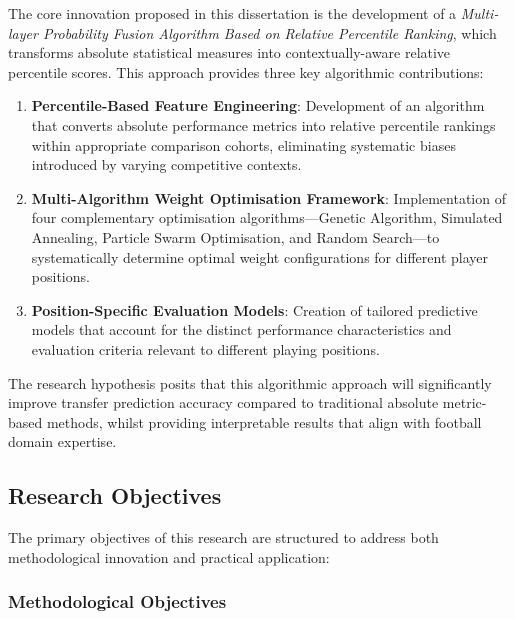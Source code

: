 The core innovation proposed in this dissertation is the development of a \textit{Multi-layer Probability Fusion Algorithm Based on Relative Percentile Ranking}, which transforms absolute statistical measures into contextually-aware relative percentile scores. This approach provides three key algorithmic contributions:

\begin{enumerate}
    \item \textbf{Percentile-Based Feature Engineering}: Development of an algorithm that converts absolute performance metrics into relative percentile rankings within appropriate comparison cohorts, eliminating systematic biases introduced by varying competitive contexts.
    
    \item \textbf{Multi-Algorithm Weight Optimisation Framework}: Implementation of four complementary optimisation algorithms—Genetic Algorithm, Simulated Annealing, Particle Swarm Optimisation, and Random Search—to systematically determine optimal weight configurations for different player positions.
    
    \item \textbf{Position-Specific Evaluation Models}: Creation of tailored predictive models that account for the distinct performance characteristics and evaluation criteria relevant to different playing positions.
\end{enumerate}

The research hypothesis posits that this algorithmic approach will significantly improve transfer prediction accuracy compared to traditional absolute metric-based methods, whilst providing interpretable results that align with football domain expertise.

\subsection{Research Objectives}

The primary objectives of this research are structured to address both methodological innovation and practical application:

\subsubsection{Methodological Objectives}

